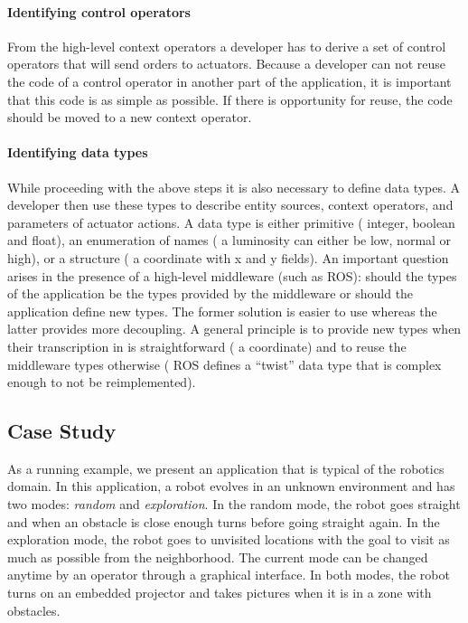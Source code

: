 \paragraph*{Identifying control operators}
From the high-level context operators a developer has to derive a set
of control operators that will send orders to actuators. Because a
developer can not reuse the code of a control operator in another part
of the application, it is important that this code is as simple as
possible. If there is opportunity for reuse, the code should be moved
to a new context operator.

\paragraph*{Identifying data types}
While proceeding with the above steps it is also necessary to define
data types. A developer then use these types to describe entity
sources, context operators, and parameters of actuator actions. A data
type is either primitive (\eg{} integer, boolean and float), an
enumeration of names (\eg{} a luminosity can either be low, normal or
high), or a structure (\eg{} a coordinate with x and y fields). An
important question arises in the presence of a high-level middleware
(such as ROS): should the types of the application be the types
provided by the middleware or should the application define new types.
The former solution is easier to use whereas the latter provides more
decoupling. A general principle is to provide new types when their
transcription in \diaspec{} is straightforward (\eg{} a coordinate)
and to reuse the middleware types otherwise (\eg{} ROS defines a
``twist'' data type that is complex enough to not be reimplemented).

\subsection{Case Study}

As a running example, we present an application that is typical of the
robotics domain. In this application, a robot evolves in an unknown
environment and has two modes: \emph{random} and \emph{exploration}.
In the random mode, the robot goes straight and when an obstacle is
close enough turns before going straight again. In the exploration
mode, the robot goes to unvisited locations with the goal to visit as
much as possible from the neighborhood. The current mode can be
changed anytime by an operator through a graphical interface. In both
modes, the robot turns on an embedded projector and takes pictures
when it is in a zone with obstacles.

